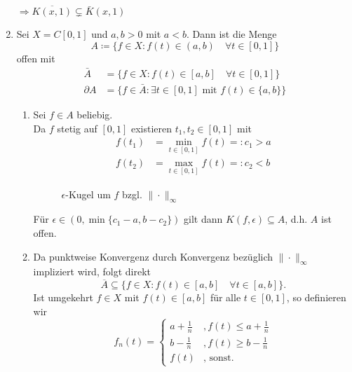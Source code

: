 \begin{beispiel}
\begin{enumerate}[label=\alph*\upshape)]
			$\Rightarrow \overline{K(x, 1)} \subsetneq \bar K(x, 1)$
		\item \label{bsp:4.11.b} Sei $X = C[0, 1]$ und $a, b > 0$ mit $a < b$. Dann ist die Menge
			\[ A \coloneqq \{ f \in X: f(t) \in (a, b) \quad \forall t \in [0, 1] \} \]
			offen mit
			\begin{align*}
				\bar A & = \{ f \in X: f(t) \in [a, b] \quad \forall t \in [0, 1] \} \\
				\partial A & = \{ f \in \bar A: \exists t \in [0, 1] \text{ mit } f(t) \in \{ a, b \} \}
			\end{align*}
			\begin{beweis}
				\begin{enumerate} 
 					\item Sei $f \in A$ beliebig. \\ 		
						Da $f$ stetig auf $[0, 1]$ existieren $t_{1}, t_{2} \in [0, 1]$ mit
						\begin{align*}
							f(t_{1}) & = \min_{t \in [0, 1]} f(t) =: c_{1} > a \\
							f(t_{2}) & = \max_{t \in [0, 1]} f(t) =: c_{2} < b
						\end{align*}
					
						\begin{figure}[H]
							\begin{center}		
								\caption{$\epsilon$-Kugel um $f$ bzgl. $\| \cdot \|_{\infty}$}
							\end{center}
						\end{figure}
															
						Für $\epsilon \in (0, \min\{c_1 - a, b - c_2\})$ gilt dann $K(f, \epsilon) \subseteq A$, d.h. $A$ ist offen.
					\item Da punktweise Konvergenz durch Konvergenz bezüglich $\| \cdot \|_{\infty}$ impliziert wird, folgt direkt
						\[ \overline{A} \subseteq \{ f\in X \colon f(t) \in [a, b] \quad \forall t \in [a,b] \}. \]
						Ist umgekehrt $f \in X$ mit $f(t) \in [a, b]$ für alle $t \in [0,1]$, so definieren wir
						\[ f_{n}(t) = \begin{cases} a + \frac{1}{n} &, f(t) \leq a + \frac{1}{n} \\ b - \frac{1}{n} &, f(t) \geq b - \frac{1}{n} \\ f(t) &, \text{ sonst.}  \end{cases}   \]
						

\end{enumerate}
\end{beweis}
\end{enumerate}
\end{beispiel}

